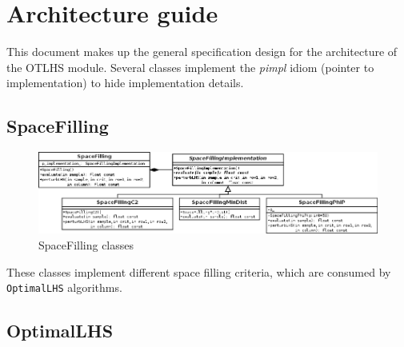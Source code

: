 %

\section{Architecture guide}

This document makes up the general specification design for the architecture of the OTLHS module.
Several classes implement the \textit{pimpl} idiom (pointer to implementation) to hide implementation
details.

\subsection{SpaceFilling}

\begin{figure}[htb]
  \begin{center}
    \includegraphics[scale=0.5]{SpaceFilling.png}
    \caption{SpaceFilling classes}\label{fig:archi:space-filling}
  \end{center}
\end{figure}

These classes implement different space filling criteria, which are consumed by
\texttt{OptimalLHS} algorithms.

\subsection{OptimalLHS}

